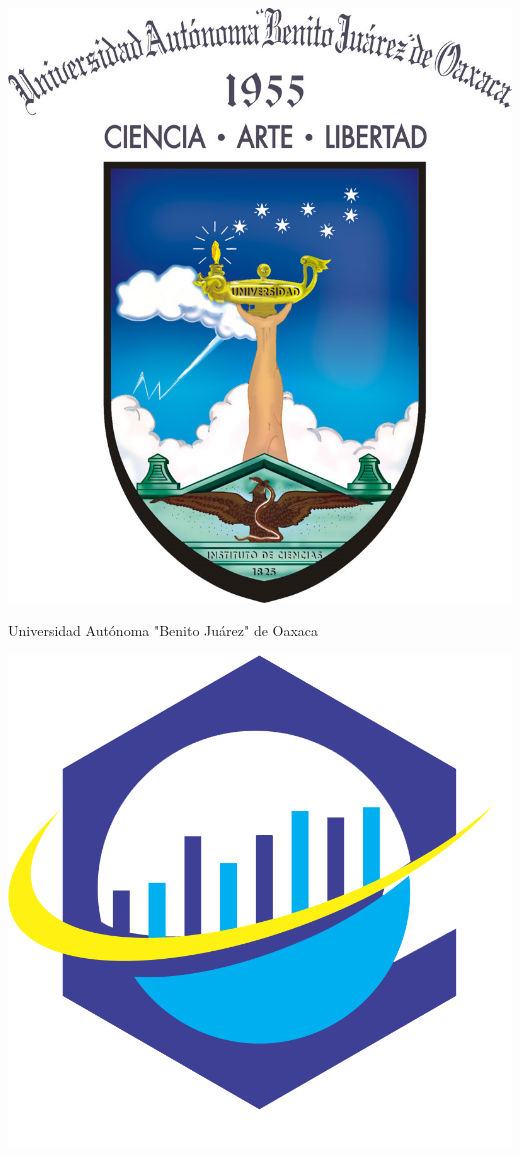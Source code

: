 \documentclass[12pt]{book}
\begin{document}
\begin{titlepage}
\begin{minipage}[c]{4cm}
\includegraphics[scale=.2]{figuras/cuadro.png} 
\end{minipage}
\begin{minipage}[c]{10cm}
\begin{center}
\huge Universidad Autónoma "Benito Juárez" de Oaxaca 
\end{center}
\end{minipage}
\begin{minipage}[c]{3cm}
\includegraphics[scale=.5]{figuras/infinito.png} 
\end{minipage}


\end{titlepage}
\end{document}
